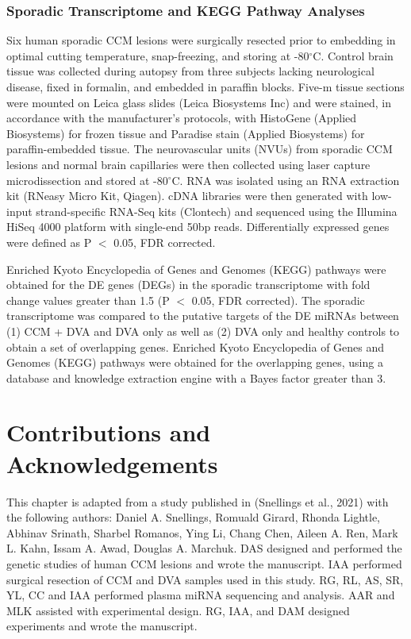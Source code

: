 \subsubsection{Sporadic Transcriptome and KEGG Pathway Analyses}

Six human sporadic CCM lesions were surgically resected prior to embedding in optimal cutting temperature, snap-freezing, and storing at -80$^{\circ}$C. Control brain tissue was collected during autopsy from three subjects lacking neurological disease, fixed in formalin, and embedded in paraffin blocks. Five-\textmu m tissue sections were mounted on Leica glass slides (Leica Biosystems Inc) and were stained, in accordance with the manufacturer’s protocols, with HistoGene (Applied Biosystems) for frozen tissue and Paradise stain (Applied Biosystems) for paraffin-embedded tissue. The neurovascular units (NVUs) from sporadic CCM lesions and normal brain capillaries were then collected using laser capture microdissection and stored at -80$^{\circ}$C. RNA was isolated using an RNA extraction kit (RNeasy Micro Kit, Qiagen). cDNA libraries were then generated with low-input strand-specific RNA-Seq kits (Clontech) and sequenced using the Illumina HiSeq 4000 platform with single-end 50bp reads. Differentially expressed genes were defined as P $<$ 0.05, FDR corrected. 

Enriched Kyoto Encyclopedia of Genes and Genomes (KEGG) pathways\citep{kanehisa2021, kanehisa2000} were obtained for the DE genes (DEGs) in the sporadic transcriptome with fold change values greater than 1.5 (P $<$ 0.05, FDR corrected). The sporadic transcriptome was compared to the putative targets of the DE miRNAs between (1) CCM + DVA and DVA only as well as (2) DVA only and healthy controls to obtain a set of overlapping genes. Enriched Kyoto Encyclopedia of Genes and Genomes (KEGG) pathways were obtained for the overlapping genes, using a database and knowledge extraction engine with a Bayes factor greater than 3. 

\section{Contributions and Acknowledgements}
This chapter is adapted from a study published in  (Snellings et al., 2021) with the following authors: Daniel A. Snellings, Romuald Girard, Rhonda Lightle, Abhinav Srinath, Sharbel Romanos, Ying Li, Chang Chen, Aileen A. Ren, Mark L. Kahn, Issam A. Awad, Douglas A. Marchuk. DAS designed and performed the genetic studies of human CCM lesions and wrote the manuscript. IAA performed surgical resection of CCM and DVA samples used in this study. RG, RL, AS, SR, YL, CC and IAA performed plasma miRNA sequencing and analysis. AAR and MLK assisted with experimental design. RG, IAA, and DAM designed experiments and wrote the manuscript.

